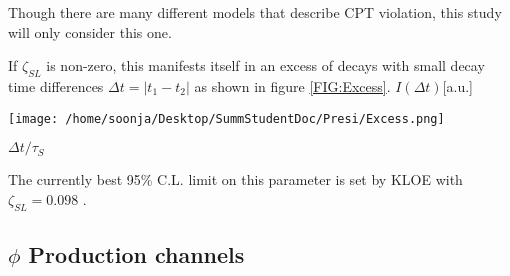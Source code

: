 Though there are many different models that describe CPT violation, this study will only consider this one. 

If $\zeta_{SL}$ is non-zero, this manifests itself in an excess of decays with small decay time differences $\Delta t = |t_1 - t_2|$ as shown in figure \ref{FIG:Excess}.
\newpage
\hspace*{3.2cm}$I(\Delta t)$[a.u.]
\vspace*{-.3cm}
\begin{center}
\texttt{[image: /home/soonja/Desktop/SummStudentDoc/Presi/Excess.png]}
\end{center}
\vspace*{-.4cm}\hspace*{12cm}$\Delta t/\tau_S$

\vspace*{.5cm}

The currently best 95\% C.L. limit on this parameter is set by KLOE with $\zeta_{SL} = 0.098$ \cite{Ambrosino2006315}.


\subsection{$\phi$ Production channels}

